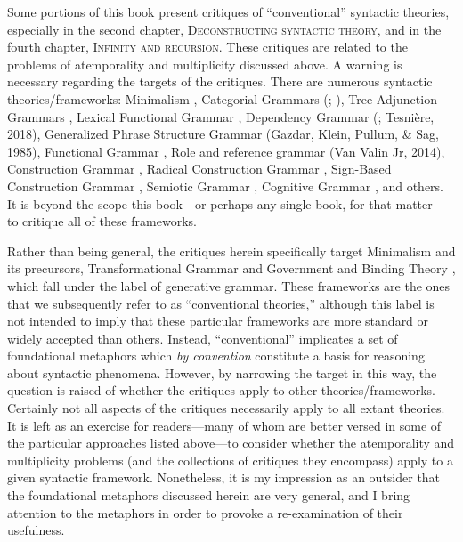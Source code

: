   Some portions of this book present critiques of “conventional” syntactic theories, especially in the second chapter, \textsc{Deconstructing syntactic theory,} and in the fourth chapter, \textsc{Infinity and recursion}. These critiques are related to the problems of atemporality and multiplicity discussed above. A warning is necessary regarding the targets of the critiques. There are numerous syntactic theories/frameworks: Minimalism \citep{Chomsky1995}, Categorial Grammars (\citealt{Steedman1993}; \citealt{Wood2014}), Tree Adjunction Grammars \citep{Joshi1987}, Lexical Functional Grammar \citep{BresnanKaplan1982}, Dependency Grammar (\citealt{Hudson1977}; Tesnière, 2018), Generalized Phrase Structure Grammar (Gazdar, Klein, Pullum, \& Sag, 1985), Functional Grammar \citep{Dik1981}, Role and reference grammar (Van Valin Jr, 2014), Construction Grammar \citep{Goldberg1995}, Radical Construction Grammar \citep{Croft2001}, Sign-Based Construction Grammar \citep{Sag2012}, Semiotic Grammar \citep{Mcgregor1997}, Cognitive Grammar \citep{Langacker2008}, and others. It is beyond the scope this book—or perhaps any single book, for that matter—to critique all of these frameworks.

Rather than being general, the critiques herein specifically target Minimalism and its precursors, Transformational Grammar \citep{Chomsky1965} and Government and Binding Theory \citep{Chomsky1982}, which fall under the label of generative grammar. These frameworks are the ones that we subsequently refer to as “conventional theories,” although this label is not intended to imply that these particular frameworks are more standard or widely accepted than others. Instead, “conventional” implicates a set of foundational metaphors which \textit{by convention} constitute a basis for reasoning about syntactic phenomena. However, by narrowing the target in this way, the question is raised of whether the critiques apply to other theories/frameworks. Certainly not all aspects of the critiques necessarily apply to all extant theories. It is left as an exercise for readers—many of whom are better versed in some of the particular approaches listed above—to consider whether the atemporality and multiplicity problems (and the collections of critiques they encompass) apply to a given syntactic framework. Nonetheless, it is my impression as an outsider that the foundational metaphors discussed herein are very general, and I bring attention to the metaphors in order to provoke a re-examination of their usefulness.

